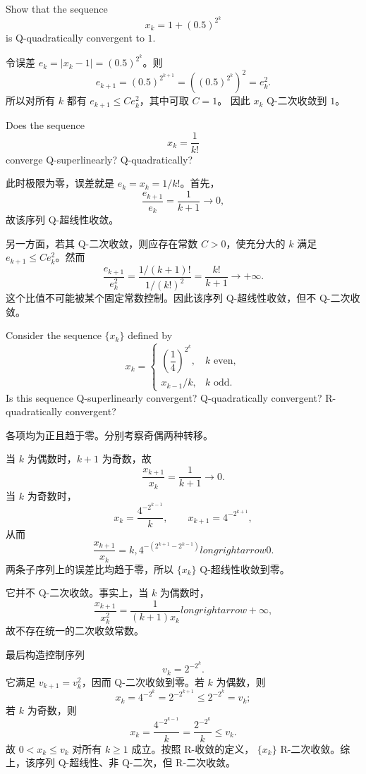 \documentclass{ctexart}
\begin{document}
\begin{problem}[2.14]
Show that the sequence
\[
    x_k=1+(0.5)^{2^k}
\]
is Q-quadratically convergent to $1$.
\end{problem}

\begin{solution}
令误差 $e_k=|x_k-1|=(0.5)^{2^k}$。则
\[
    e_{k+1}=(0.5)^{2^{k+1}}
    =\left((0.5)^{2^k}\right)^2=e_k^2.
\]
所以对所有 $k$ 都有 $e_{k+1}\leq Ce_k^2$，其中可取 $C=1$。
因此 $x_k$ Q-二次收敛到 $1$。
\end{solution}

\begin{problem}[2.15]
Does the sequence
\[
    x_k=\frac{1}{k!}
\]
converge Q-superlinearly? Q-quadratically?
\end{problem}

\begin{solution}
此时极限为零，误差就是 $e_k=x_k=1/k!$。首先，
\[
    \frac{e_{k+1}}{e_k}=\frac1{k+1}\longrightarrow0,
\]
故该序列 Q-超线性收敛。

另一方面，若其 Q-二次收敛，则应存在常数 $C>0$，使充分大的 $k$ 满足
$e_{k+1}\leq Ce_k^2$。然而
\[
    \frac{e_{k+1}}{e_k^2}
    =\frac{1/(k+1)!}{1/(k!)^2}
    =\frac{k!}{k+1}\longrightarrow+\infty.
\]
这个比值不可能被某个固定常数控制。因此该序列 Q-超线性收敛，但不 Q-二次收敛。
\end{solution}

\begin{problem}[2.16]
Consider the sequence $\{x_k\}$ defined by
\[
    x_k=
    \begin{cases}
        \left(\dfrac14\right)^{2^k}, & k \text{ even},\\[2mm]
        x_{k-1}/k, & k \text{ odd}.
    \end{cases}
\]
Is this sequence Q-superlinearly convergent? Q-quadratically convergent?
R-quadratically convergent?
\end{problem}

\begin{solution}
各项均为正且趋于零。分别考察奇偶两种转移。

当 $k$ 为偶数时，$k+1$ 为奇数，故
\[
    \frac{x_{k+1}}{x_k}=\frac1{k+1}\longrightarrow0.
\]
当 $k$ 为奇数时，
\[
    x_k=\frac{4^{-2^{k-1}}}{k},
    \qquad x_{k+1}=4^{-2^{k+1}},
\]
从而
\[
    \frac{x_{k+1}}{x_k}
    =k,4^{-(2^{k+1}-2^{k-1})}longrightarrow0.
\]
两条子序列上的误差比均趋于零，所以 $\{x_k\}$ Q-超线性收敛到零。

它并不 Q-二次收敛。事实上，当 $k$ 为偶数时，
\[
    \frac{x_{k+1}}{x_k^2}
    =\frac{1}{(k+1)x_k}longrightarrow+\infty,
\]
故不存在统一的二次收敛常数。

最后构造控制序列
\[
    v_k=2^{-2^k}.
\]
它满足 $v_{k+1}=v_k^2$，因而 Q-二次收敛到零。若 $k$ 为偶数，则
\[
    x_k=4^{-2^k}=2^{-2^{k+1}}\leq2^{-2^k}=v_k;
\]
若 $k$ 为奇数，则
\[
    x_k=\frac{4^{-2^{k-1}}}{k}
       =\frac{2^{-2^k}}{k}\leq v_k.
\]
故 $0<x_k\leq v_k$ 对所有 $k\geq1$ 成立。按照 R-收敛的定义，
$\{x_k\}$ R-二次收敛。综上，该序列 Q-超线性、非 Q-二次，但 R-二次收敛。
\end{solution}
\end{document}

